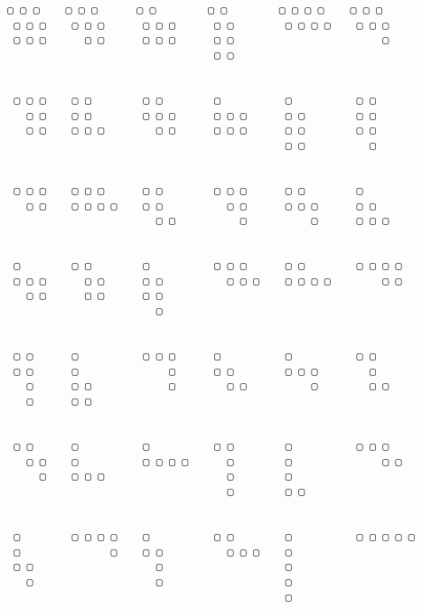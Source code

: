 \begin{Verbatim}[baselinestretch=0.5, fontsize=\small]
 ▢ ▢ ▢    ▢ ▢ ▢      ▢ ▢        ▢ ▢        ▢ ▢ ▢ ▢    ▢ ▢ ▢
 ▢ ▢ ▢    ▢ ▢ ▢      ▢ ▢ ▢      ▢ ▢        ▢ ▢ ▢ ▢    ▢ ▢ ▢
 ▢ ▢ ▢      ▢ ▢      ▢ ▢ ▢      ▢ ▢                       ▢
                                ▢ ▢


 ▢ ▢ ▢    ▢ ▢        ▢ ▢        ▢          ▢          ▢ ▢
   ▢ ▢    ▢ ▢        ▢ ▢ ▢      ▢ ▢ ▢      ▢ ▢        ▢ ▢
   ▢ ▢    ▢ ▢ ▢        ▢ ▢      ▢ ▢ ▢      ▢ ▢        ▢ ▢
                                           ▢ ▢          ▢


 ▢ ▢ ▢    ▢ ▢ ▢      ▢ ▢        ▢ ▢ ▢      ▢ ▢        ▢
   ▢ ▢    ▢ ▢ ▢ ▢    ▢ ▢          ▢ ▢      ▢ ▢ ▢      ▢ ▢
                       ▢ ▢          ▢          ▢      ▢ ▢ ▢


 ▢        ▢ ▢        ▢          ▢ ▢ ▢      ▢ ▢        ▢ ▢ ▢ ▢
 ▢ ▢ ▢      ▢ ▢      ▢ ▢          ▢ ▢ ▢    ▢ ▢ ▢ ▢        ▢ ▢
   ▢ ▢      ▢ ▢      ▢ ▢
                       ▢


 ▢ ▢      ▢          ▢ ▢ ▢      ▢          ▢          ▢ ▢
 ▢ ▢      ▢              ▢      ▢ ▢        ▢ ▢ ▢        ▢
   ▢      ▢ ▢            ▢        ▢ ▢          ▢        ▢ ▢
   ▢      ▢ ▢


 ▢ ▢      ▢          ▢          ▢ ▢        ▢          ▢ ▢ ▢
   ▢ ▢    ▢          ▢ ▢ ▢ ▢      ▢        ▢              ▢ ▢
     ▢    ▢ ▢ ▢                   ▢        ▢
                                  ▢        ▢ ▢


 ▢        ▢ ▢ ▢ ▢    ▢          ▢ ▢        ▢          ▢ ▢ ▢ ▢ ▢
 ▢              ▢    ▢ ▢          ▢ ▢ ▢    ▢
 ▢ ▢                   ▢                   ▢
   ▢                   ▢                   ▢
                                           ▢
\end{Verbatim}


